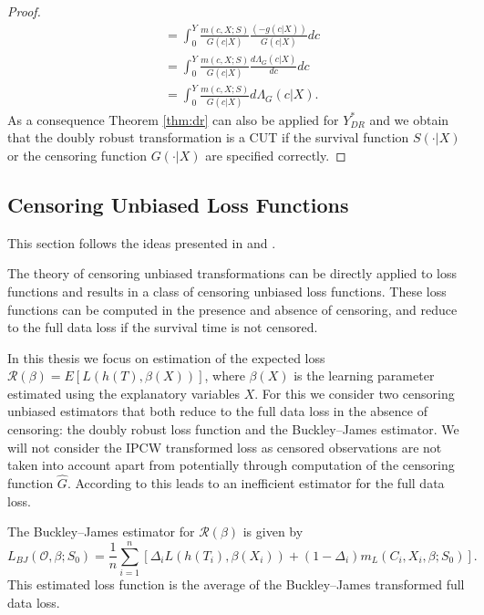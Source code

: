 \documentclass[12pt, a4paper]{scrartcl}
\theoremstyle{definition}
\theoremstyle{plain}
\numberwithin{equation}{section}
\numberwithin{figure}{section}
\numberwithin{table}{section}
\begin{document}
\begin{proof}
\begin{equation*}
\begin{split}
		& ={} \int_{0}^{Y}\frac{m(c,X;S)}{G(c\vert X)}\frac{(-g(c\vert X))}{G(c\vert X)}dc\\
		&={} \int_{0}^{Y}\frac{m(c,X;S)}{G(c\vert X)}\frac{d\Lambda_G(c \vert X)}{dc}dc\\
		&={} \int_{0}^{Y}\frac{m(c,X;S)}{G(c\vert X)}d\Lambda_G(c \vert X).
		\end{split}
		\end{equation*}
		As a consequence Theorem \ref{thm:dr} can also be applied for $Y_{DR}^*$ and we obtain that the doubly robust transformation is a CUT if the survival function $S(\cdot\vert X)$ or the censoring function $G(\cdot\vert X)$ are specified correctly.
	\end{proof}

	\subsection{Censoring Unbiased Loss Functions}\label{sec:cudls}
	This section follows the ideas presented in \citet*{culs} and \citet*{basearticle}.
	
	The theory of censoring unbiased transformations can be directly applied to loss functions and results in a class of censoring unbiased loss functions. 
	These loss functions can be computed in the presence and absence of censoring, and reduce to the full data loss if the survival time is not censored.
	
	In this thesis we focus on estimation of the expected loss~$\mathcal{R} (\beta) = E[L(h(T),\beta(X))]$, where $\beta(X)$ is the learning parameter estimated using the explanatory variables $X$.
	For this we consider two censoring unbiased estimators that both reduce to the full data loss in the absence of censoring: the doubly robust loss function and the Buckley--James estimator.
	We will not consider the IPCW transformed loss as censored observations are not taken into account apart from potentially through computation of the censoring function $\hat{G}$.
	According to \citet*{basearticle-arxiv} this leads to an inefficient estimator for the full data loss.
	
	The Buckley--James estimator for $\mathcal{R}(\beta)$ is given by
	\begin{equation}\label{eq:bj}
	L_{BJ}(\mathcal{O}, \beta; S_0) = \frac{1}{n} \sum_{i=1}^n \left[ \Delta_i L(h(T_i), \beta(X_i))+(1-\Delta_i)m_L(C_i, X_i, \beta; S_0)\right].
	\end{equation}
	This estimated loss function is the average of the Buckley--James transformed full data loss.
	
\end{document}
